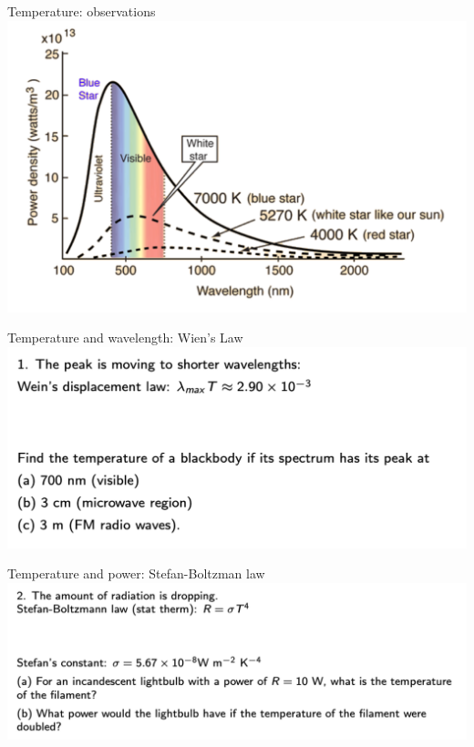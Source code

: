 \begin{frame}{Temperature: observations}
\small
\includegraphics[scale=0.45]{bbspectrum}
\end{frame}




\begin{frame}{Temperature and wavelength: Wien's Law}
\small
\includegraphics[scale=0.35]{wien}
\end{frame}


\begin{frame}{Temperature and power: Stefan-Boltzman law}
\small
\includegraphics[scale=0.35]{stefan}
\end{frame}


%
%
%
 
